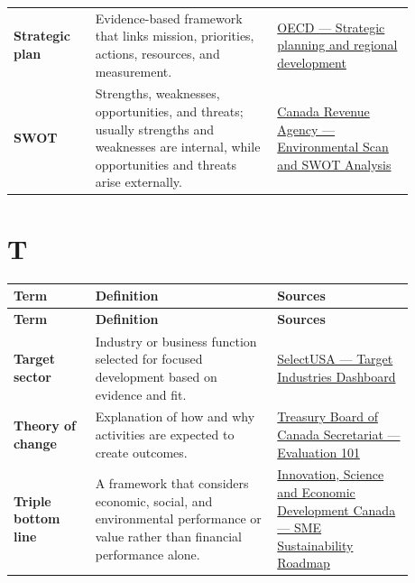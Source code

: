 \documentclass[11pt,letterpaper,oneside,openany]{book}
\begin{document}
\begin{center}
\begin{longtable}{>{\RaggedRight\arraybackslash}p{0.180\linewidth}>{\RaggedRight\arraybackslash}p{0.400\linewidth}>{\RaggedRight\arraybackslash}p{0.300\linewidth}}
\textbf{Strategic plan} & Evidence-based framework that links mission, priorities, actions, resources, and measurement. & \href{https://www.oecd.org/en/topics/sub-issues/strategic-planning-and-regional-development.html}{OECD --- Strategic planning and regional development} \\
\textbf{SWOT} & Strengths, weaknesses, opportunities, and threats; usually strengths and weaknesses are internal, while opportunities and threats arise externally. & \href{https://www.canada.ca/en/revenue-agency/corporate/about-canada-revenue-agency-cra/sustainable-development/sustainable-development-strategies/sustainable-development-strategy-2007-2010-10.html}{Canada Revenue Agency --- Environmental Scan and SWOT Analysis} \\
\end{longtable}
\end{center}
\section[T]{T}
\begin{center}
\small
\setlength{\LTpre}{0.4em}
\setlength{\LTpost}{0.8em}
\begin{longtable}{>{\RaggedRight\arraybackslash}p{0.180\linewidth}>{\RaggedRight\arraybackslash}p{0.400\linewidth}>{\RaggedRight\arraybackslash}p{0.300\linewidth}}
\rowcolor{DeepNavy}
\color{white}\bfseries Term & \color{white}\bfseries Definition & \color{white}\bfseries Sources \\
\endfirsthead
\rowcolor{DeepNavy}
\color{white}\bfseries Term & \color{white}\bfseries Definition & \color{white}\bfseries Sources \\
\endhead
\textbf{Target sector} & Industry or business function selected for focused development based on evidence and fit. & \href{https://www.trade.gov/selectusa-target-industries-dashboard}{SelectUSA --- Target Industries Dashboard} \\
\textbf{Theory of change} & Explanation of how and why activities are expected to create outcomes. & \href{https://www.canada.ca/en/treasury-board-secretariat/services/audit-evaluation/evaluation-government-canada/evaluation-101-backgrounder.html}{Treasury Board of Canada Secretariat --- Evaluation 101} \\
\textbf{Triple bottom line} & A framework that considers economic, social, and environmental performance or value rather than financial performance alone. & \href{https://ised-isde.canada.ca/site/corporate-social-responsibility/en/sme-sustainability-roadmap}{Innovation, Science and Economic Development Canada --- SME Sustainability Roadmap} \\
\end{longtable}
\end{center}
\end{document}
